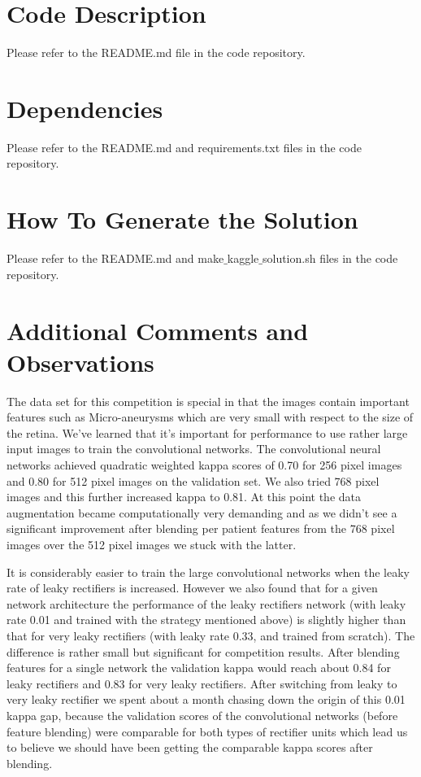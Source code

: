 \documentclass[12pt,a4paper]{scrartcl}
\begin{document}
%
\section{Code Description}
Please refer to the README.md file in the code repository.
\section{Dependencies}
Please refer to the README.md and requirements.txt files in the code repository.
\section{How To Generate the Solution}
Please refer to the README.md and make$\_$kaggle$\_$solution.sh files in the code repository.
\section{Additional Comments and Observations}
The data set for this competition is special in that the images contain important features such as Micro-aneurysms which are very small with respect to the size of the retina. We've learned that it's important for performance to use rather large input images to train the convolutional networks. The convolutional neural networks achieved quadratic weighted kappa scores of 0.70 for 256 pixel images and 0.80 for 512 pixel images on the validation set. We also tried 768 pixel images and this further increased kappa to 0.81. At this point the data augmentation became computationally very demanding and as we didn't see a significant improvement after blending per patient features from the 768 pixel images over the 512 pixel images we stuck with the latter.

It is considerably easier to train the large convolutional networks when the leaky rate of leaky rectifiers is increased. However we also found that for a given network architecture the performance of the leaky rectifiers network (with leaky rate 0.01 and trained with the strategy mentioned above) is slightly higher than that for very leaky rectifiers (with leaky rate 0.33, and trained from scratch). The difference is rather small but significant for competition results. After blending features for a single network the validation kappa would reach about 0.84 for leaky rectifiers and 0.83 for very leaky rectifiers. After switching from leaky to very leaky rectifier we spent about a month chasing down the origin of this 0.01 kappa gap, because the validation scores of the convolutional networks (before feature blending) were comparable for both types of rectifier units which lead us to believe we should have been getting the comparable kappa scores after blending.
\end{document}
